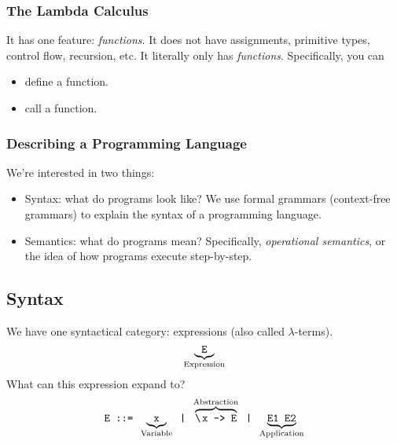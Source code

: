 \documentclass[letterpaper]{article}
\begin{document}
\subsubsection{The Lambda Calculus}
It has one feature: \emph{functions}. It does not have assignments, primitive types, control flow, recursion, etc. It literally only has \emph{functions}. Specifically, you can
\begin{itemize}
    \item define a function. 
    \item call a function. 
\end{itemize}

\subsubsection{Describing a Programming Language}
We're interested in two things: 
\begin{itemize}
    \item Syntax: what do programs look like? We use formal grammars (context-free grammars) to explain the syntax of a programming language.
    \item Semantics: what do programs mean? Specifically, \emph{operational semantics}, or the idea of how programs execute step-by-step. 
\end{itemize}

\subsection{Syntax}
We have one syntactical category: expressions (also called $\lambda$-terms).
\[\underbrace{\texttt{E}}_{\text{Expression}}\]
What can this expression expand to? 
\[\code{E ::= } \underbrace{\code{x}}_{\text{Variable}} \code{ | } \overbrace{\code{\bsttt{x} -> E}}^{\text{Abstraction}} \code{ | } \underbrace{\code{E1 E2}}_{\text{Application}}\]
\end{document}
